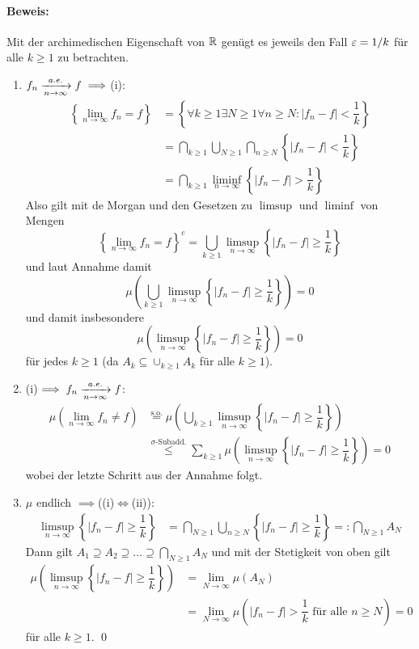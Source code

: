 \documentclass[11pt]{report}
\begin{document}
\paragraph{Beweis:}Mit der archimedischen Eigenschaft  von $\mathbb{R}$ gen\"ugt es jeweils den Fall $\varepsilon=1/k$ f\"ur alle $k\geq1$ zu betrachten. 
\begin{enumerate}[label=\Roman*.]
    \item $f_n\nto{a.e.}{n\to\infty}f\implies$(i):
\begin{align*}
    \left\{\lim_{n\to\infty}f_n=f\right\}&=\left\{\forall k\geq1\exists N\geq1\forall n\geq N:|f_n-f|<\dfrac{1}{k}\right\} \\
    &=\bigcap_{k\geq1}\bigcup_{N\geq1}\bigcap_{n\geq N}\left\{|f_n-f|<\dfrac{1}{k}\right\}\\
    &=\bigcap_{k\geq1}\liminf_{n\to\infty}\left\{|f_n-f|>\dfrac{1}{k}\right\}
\end{align*}
Also gilt mit de Morgan und den Gesetzen zu $\limsup$ und $\liminf$ von Mengen
$$\left\{\lim_{n\to\infty}f_n=f\right\}^c=\bigcup_{k\geq1}\limsup_{n\to\infty}\left\{|f_n-f|\geq\dfrac{1}{k}\right\}$$
und laut Annahme damit
$$\mu\left(\bigcup_{k\geq1}\limsup_{n\to\infty}\left\{|f_n-f|\geq\dfrac{1}{k}\right\}\right)=0$$
und damit insbesondere
$$\mu\left(\limsup_{n\to\infty}\left\{|f_n-f|\geq\dfrac{1}{k}\right\}\right)=0$$
f\"ur jedes $k\geq1$ (da $A_k\subseteq\cup_{k\geq1}A_k$ f\"ur alle $k\geq1$).
    \item (i)$\implies f_n\nto{a.e.}{n\to\infty}f$:
\begin{align*}
    \mu\left(\lim_{n\to\infty}f_n\neq f\right)&\overset{\text{s.o.}}{=}\mu\left(\bigcup_{k\geq1}\limsup_{n\to\infty}\left\{|f_n-f|\geq\dfrac{1}{k}\right\}\right)\\
    &\overset{\sigma\text{-Subadd.}}{\leq}\sum_{k\geq1}\mu\left(\limsup_{n\to\infty}\left\{|f_n-f|\geq\dfrac{1}{k}\right\}\right)=0
\end{align*}
wobei der letzte Schritt aus der Annahme folgt.
    \item $\mu$ endlich $\implies$((i)$\iff$(ii)):\newline
\begin{align*}
    \limsup_{n\to\infty}\left\{|f_n-f|\geq\dfrac{1}{k}\right\}&=\bigcap_{N\geq1}\bigcup_{n\geq N}\left\{|f_n-f|\geq\dfrac{1}{k}\right\}=:\bigcap_{N\geq1}A_N
\end{align*}
Dann gilt $A_1\supseteq A_2\supseteq\hdots\supseteq\bigcap_{N\geq1}A_N$ und mit der Stetigkeit von oben gilt
\begin{align*}
    \mu\left(\limsup_{n\to\infty}\left\{|f_n-f|\geq\dfrac{1}{k}\right\}\right)&=\lim_{N\to\infty}\mu(A_N)\\
    &=\lim_{N\to\infty}\mu\left(|f_n-f|>\dfrac{1}{k}\text{ f\"ur alle }n\geq N\right)=0
\end{align*}
f\"ur alle $k\geq1$. \qed
\end{enumerate}
\end{document}
